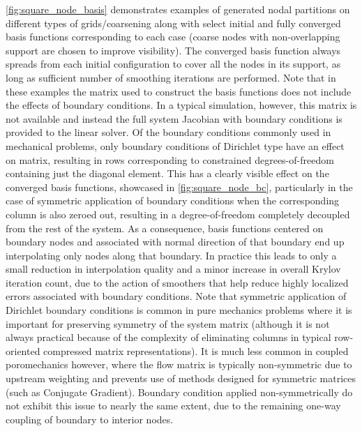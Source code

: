 \autoref{fig:square_node_basis} demonstrates examples of generated nodal partitions on different types of grids/coarsening along with select initial and fully converged basis functions corresponding to each case (coarse nodes with non-overlapping support are chosen to improve visibility).   The converged basis function always spreads from each initial configuration to cover all the nodes in its support, as long as sufficient number of smoothing iterations are performed.   Note that in these examples the matrix used to construct the basis functions does not include the effects of boundary conditions.   In a typical simulation, however, this matrix is not available and instead the full system Jacobian with boundary conditions is provided to the linear solver.   Of the boundary conditions commonly used in mechanical problems, only boundary conditions of Dirichlet type have an effect on matrix, resulting in rows corresponding to constrained degrees-of-freedom containing just the diagonal element.   This has a clearly visible effect on the converged basis functions, showcased in \autoref{fig:square_node_bc}, particularly in the case of symmetric application of boundary conditions when the corresponding column is also zeroed out, resulting in a degree-of-freedom completely decoupled from the rest of the system.   As a consequence, basis functions centered on boundary nodes and associated with normal direction of that boundary end up interpolating only nodes along that boundary.   In practice this leads to only a small reduction in interpolation quality and a minor increase in overall Krylov iteration count, due to the action of smoothers that help reduce highly localized  errors associated with boundary conditions.   Note that symmetric application of Dirichlet boundary conditions is common in pure mechanics problems where it is important for preserving symmetry of the system matrix (although it is not always practical because of the complexity of eliminating columns in typical row-oriented compressed matrix representations).   It is much less common in coupled poromechanics however, where the flow matrix is typically non-symmetric due to upstream weighting and prevents use of methods designed for symmetric matrices (such as Conjugate Gradient).   Boundary condition applied non-symmetrically do not exhibit this issue to nearly the same extent, due to the remaining one-way coupling of boundary to interior nodes.

